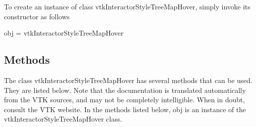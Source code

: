 To create an instance of class vtk\-Interactor\-Style\-Tree\-Map\-Hover, simply invoke its constructor as follows \begin{DoxyVerb}  obj = vtkInteractorStyleTreeMapHover
\end{DoxyVerb}
 \hypertarget{vtkwidgets_vtkxyplotwidget_Methods}{}\subsection{Methods}\label{vtkwidgets_vtkxyplotwidget_Methods}
The class vtk\-Interactor\-Style\-Tree\-Map\-Hover has several methods that can be used. They are listed below. Note that the documentation is translated automatically from the V\-T\-K sources, and may not be completely intelligible. When in doubt, consult the V\-T\-K website. In the methods listed below, {\ttfamily obj} is an instance of the vtk\-Interactor\-Style\-Tree\-Map\-Hover class. 

